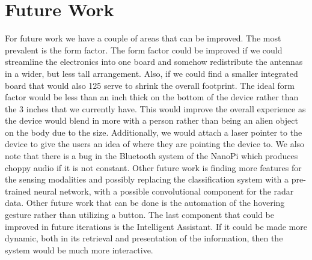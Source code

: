 \section{Future Work}
For future work we have a couple of areas that can be improved. The most prevalent
is the form factor. The form factor could be improved if we could streamline the
electronics into one board and somehow redistribute the antennas in a wider, but less
tall arrangement. Also, if we could find a smaller integrated board that would also
125
serve to shrink the overall footprint. The ideal form factor would be less than an inch
thick on the bottom of the device rather than the 3 inches that we currently have.
This would improve the overall experience as the device would blend in more with a
person rather than being an alien object on the body due to the size.
Additionally, we would attach a laser pointer to the device to give the users an idea
of where they are pointing the device to. We also note that there is a bug in the Bluetooth system of the NanoPi which produces choppy audio if it is not constant.
Other future work is finding more features for the sensing modalities and possibly
replacing the classification system with a pre-trained neural network, with a possible
convolutional component for the radar data. Other future work that can be done
is the automation of the hovering gesture rather than utilizing a button. The last
component that could be improved in future iterations is the Intelligent Assistant. If it
could be made more dynamic, both in its retrieval and presentation of the information,
then the system would be much more interactive.



